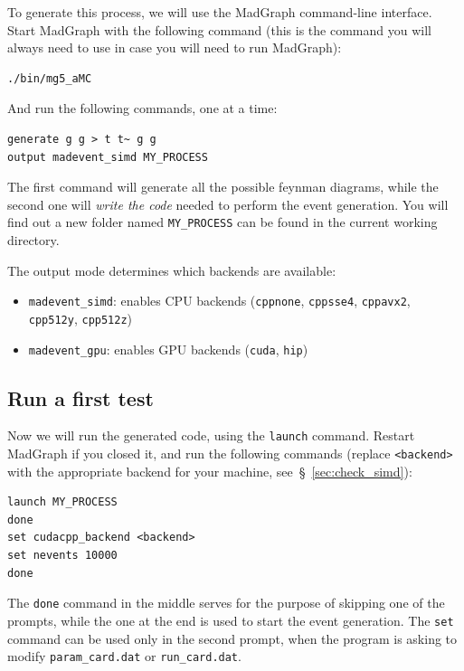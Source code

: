 \documentclass[11pt,a4paper]{article}
\begin{document}
To generate this process, we will use the MadGraph command-line interface.
Start MadGraph with the following command (this is the command you will always need to use in case you will need to run MadGraph):
\begin{lstlisting}[style=bashstyle]
./bin/mg5_aMC
\end{lstlisting}

And run the following commands, one at a time:
\begin{lstlisting}
generate g g > t t~ g g
output madevent_simd MY_PROCESS
\end{lstlisting}

The first command will generate all the possible feynman diagrams, while the second one will \emph{write the code} needed to perform the event generation.
You will find out a new folder named \texttt{MY\_PROCESS} can be found in the current working directory.

\begin{tipbox}
The output mode determines which backends are available:
\begin{itemize}[nosep]
    \item \texttt{madevent\_simd}: enables CPU backends (\texttt{cppnone}, \texttt{cppsse4}, \texttt{cppavx2}, \texttt{cpp512y}, \texttt{cpp512z})
    \item \texttt{madevent\_gpu}: enables GPU backends (\texttt{cuda}, \texttt{hip})
\end{itemize}
\end{tipbox}

\subsection{Run a first test}

Now we will run the generated code, using the \texttt{launch} command.
Restart MadGraph if you closed it, and run the following commands (replace \texttt{<backend>} with the appropriate backend for your machine, see~\S~\ref{sec:check_simd}):

\begin{lstlisting}
launch MY_PROCESS
done
set cudacpp_backend <backend>
set nevents 10000
done
\end{lstlisting}

The \texttt{done} command in the middle serves for the purpose of skipping one of the prompts, while the one at the end is used to start the event generation.
The \texttt{set} command can be used only in the second prompt, when the program is asking to modify \texttt{param\_card.dat} or \texttt{run\_card.dat}.
\end{document}
